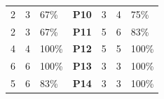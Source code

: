 \begin{table}[]
\begin{tabular}{rrlcrrl}
2                                                                                             & 3                                                                                          & 67\%                                                                                    & \textbf{P10}                             & 3                                                                                             & 4                                                                                          & 75\%                                                                                     \\
2                                                                                             & 3                                                                                          & 67\%                                                                                    & \textbf{P11}                             & 5                                                                                             & 6                                                                                          & 83\%                                                                                     \\
4                                                                                             & 4                                                                                          & 100\%                                                                                   & \textbf{P12}                             & 5                                                                                             & 5                                                                                          & 100\%                                                                                    \\
6                                                                                             & 6                                                                                          & 100\%                                                                                   & \textbf{P13}                             & 3                                                                                             & 3                                                                                          & 100\%                                                                                    \\
5                                                                                             & 6                                                                                          & 83\%                                                                                    & \textbf{P14}                             & 3                                                                                             & 3                                                                                          & 100\%     \\
\bottomrule
\end{tabular}
\end{table}

